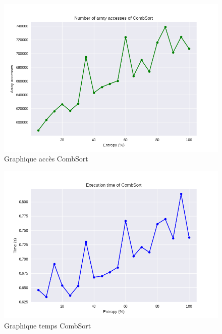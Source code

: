 \documentclass[10pt,a4paper]{article}
\begin{document}
            \begin{figure}
                \centering
                \includegraphics[width=1\textwidth]{graphique/CombSort/GraphAccessesCombSort.png}
                \caption{Graphique accès CombSort}
                \label{fig:mesh1}
            \end{figure}
            \begin{figure}
                \centering
                \includegraphics[width=1\textwidth]{graphique/CombSort/GraphTimeCombSort.png}
                \caption{Graphique temps CombSort}
                \label{fig:mesh1}
            \end{figure}
\end{document}
